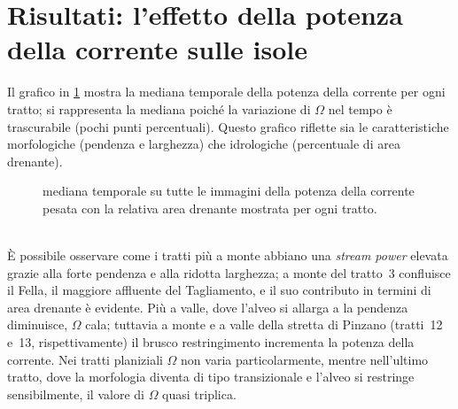 \section{Risultati: l'effetto della potenza della corrente sulle isole}
Il grafico in \cref{graph:omega-perc-50} mostra la mediana temporale della potenza della corrente per ogni tratto; si rappresenta la mediana poiché la variazione di $\Omega$ nel tempo è trascurabile (pochi punti percentuali).
Questo grafico riflette sia le caratteristiche morfologiche (pendenza e larghezza) che idrologiche (percentuale di area drenante).
%
\begin{figure}
	\centering
	
	\caption[potenza della corrente in ogni tratto]{mediana temporale su tutte le immagini della potenza della corrente pesata con la relativa area drenante mostrata per ogni tratto.}
	\label{graph:omega-perc-50}
\end{figure}
%
\\
È possibile osservare come i tratti più a monte abbiano una \emph{stream power} elevata grazie alla forte pendenza e alla ridotta larghezza; a monte del tratto~3 confluisce il Fella, il maggiore affluente del Tagliamento, e il suo contributo in termini di area drenante è evidente.
Più a valle, dove l'alveo si allarga a la pendenza diminuisce, $\Omega$ cala; tuttavia a monte e a valle della stretta di Pinzano (tratti~12 e~13, rispettivamente) il brusco restringimento incrementa la potenza della corrente.
Nei tratti planiziali $\Omega$ non varia particolarmente, mentre nell'ultimo tratto, dove la morfologia diventa di tipo transizionale e l'alveo si restringe sensibilmente, il valore di $\Omega$ quasi triplica.

